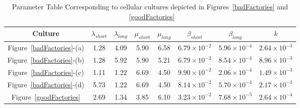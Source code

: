 \begin{table}[t]
\renewcommand{\arraystretch}{1.3}
\caption{Parameter Table Corresponding to cellular cultures depicted in Figures~\ref{badFactories} and ~\ref{goodFactories}}
\label{figure-param-table}
\centering
\begin{tabular}{c||c||c||c||c||c||c||c}
\hline
\bfseries Culture  & \bfseries $\lambda_{short}$ & \bfseries $\lambda_{long}$ & \bfseries $\mu_{short}$ & \bfseries $\mu_{long}$ & \bfseries $\beta_{short} $ & \bfseries $\beta_{long}$ & \bfseries $k$ \\
\hline\hline
Figure~\ref{badFactories}-(a) & 1.28	& 4.09	& 5.90	& 6.58	& $6.79 \times 10^{-2}$ & $5.96 \times 10^{-4}$	& $2.64 \times 10^{-3}$\\
Figure~\ref{badFactories}-(b) & 1.28	& 5.92 &	5.90	& 5.21	& $6.79 \times 10^{-2}$ & $8.54 \times 10^{-4}$	& $8.96 \times 10^{-3}$\\
Figure~\ref{badFactories}-(c) & 1.11	& 1.22	& 6.69	& 4.50	& $9.90 \times 10^{-2}$	& $2.06 \times 10^{-4}$	& $1.49 \times 10^{-3}$\\
Figure~\ref{badFactories}-(d) & 5.73	& 1.22	& 6.69	& 4.50	& $8.14 \times 10^{-2}$	& $5.70 \times 10^{-4}$	& $2.17 \times 10^{-3}$\\
Figure~\ref{goodFactories}     & 2.69	& 1.34 & 	3.85  	& 6.10	&  	 	$3.23 \times 10^{-2}$ & $7.68 \times 10^{-5}$ &	$2.64 \times 10^{-4}$ \\
\hline
\end{tabular}
\end{table}

